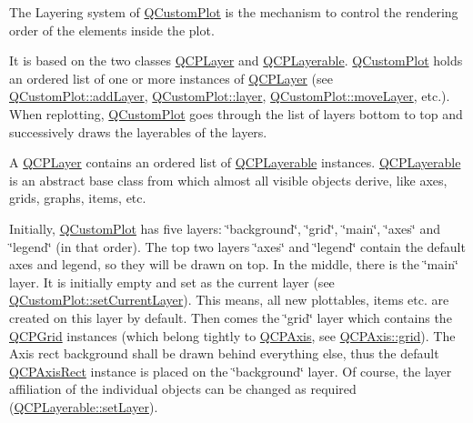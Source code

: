 The Layering system of \hyperlink{class_q_custom_plot}{Q\+Custom\+Plot} is the mechanism to control the rendering order of the elements inside the plot.

It is based on the two classes \hyperlink{class_q_c_p_layer}{Q\+C\+P\+Layer} and \hyperlink{class_q_c_p_layerable}{Q\+C\+P\+Layerable}. \hyperlink{class_q_custom_plot}{Q\+Custom\+Plot} holds an ordered list of one or more instances of \hyperlink{class_q_c_p_layer}{Q\+C\+P\+Layer} (see \hyperlink{class_q_custom_plot_ad5255393df078448bb6ac83fa5db5f52}{Q\+Custom\+Plot\+::add\+Layer}, \hyperlink{class_q_custom_plot_aac492da01782820454e9136a8db28182}{Q\+Custom\+Plot\+::layer}, \hyperlink{class_q_custom_plot_ae896140beff19424e9e9e02d6e331104}{Q\+Custom\+Plot\+::move\+Layer}, etc.). When replotting, \hyperlink{class_q_custom_plot}{Q\+Custom\+Plot} goes through the list of layers bottom to top and successively draws the layerables of the layers.

A \hyperlink{class_q_c_p_layer}{Q\+C\+P\+Layer} contains an ordered list of \hyperlink{class_q_c_p_layerable}{Q\+C\+P\+Layerable} instances. \hyperlink{class_q_c_p_layerable}{Q\+C\+P\+Layerable} is an abstract base class from which almost all visible objects derive, like axes, grids, graphs, items, etc.

Initially, \hyperlink{class_q_custom_plot}{Q\+Custom\+Plot} has five layers\+: \char`\"{}background\char`\"{}, \char`\"{}grid\char`\"{}, \char`\"{}main\char`\"{}, \char`\"{}axes\char`\"{} and \char`\"{}legend\char`\"{} (in that order). The top two layers \char`\"{}axes\char`\"{} and \char`\"{}legend\char`\"{} contain the default axes and legend, so they will be drawn on top. In the middle, there is the \char`\"{}main\char`\"{} layer. It is initially empty and set as the current layer (see \hyperlink{class_q_custom_plot_a73a6dc47c653bb6f8f030abca5a11852}{Q\+Custom\+Plot\+::set\+Current\+Layer}). This means, all new plottables, items etc. are created on this layer by default. Then comes the \char`\"{}grid\char`\"{} layer which contains the \hyperlink{class_q_c_p_grid}{Q\+C\+P\+Grid} instances (which belong tightly to \hyperlink{class_q_c_p_axis}{Q\+C\+P\+Axis}, see \hyperlink{class_q_c_p_axis_ac4fb913cce3072b5e75a4635e0f6cd04}{Q\+C\+P\+Axis\+::grid}). The Axis rect background shall be drawn behind everything else, thus the default \hyperlink{class_q_c_p_axis_rect}{Q\+C\+P\+Axis\+Rect} instance is placed on the \char`\"{}background\char`\"{} layer. Of course, the layer affiliation of the individual objects can be changed as required (\hyperlink{class_q_c_p_layerable_ab0d0da6d2de45a118886d2c8e16d5a54}{Q\+C\+P\+Layerable\+::set\+Layer}).

